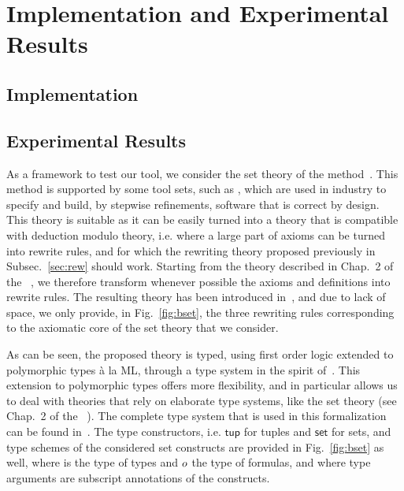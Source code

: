 
\section{Implementation and Experimental Results}
\label{sec:bench}

\subsection{Implementation}



\subsection{Experimental Results}

As a framework to test our tool, we consider the set theory of the \bmth{}
method~\cite{B-Book}. This method is supported by some tool sets, such as
\atelierb{}, which are used in industry to specify and build, by stepwise
refinements, software that is correct by design. This theory is suitable as it
can be easily turned into a theory that is compatible with deduction modulo
theory, i.e. where a large part of axioms can be turned into rewrite rules, and
for which the rewriting theory proposed previously in Subsec.~\ref{sec:rew}
should work. Starting from the theory described in Chap.~2 of the
\bbook{}~\cite{B-Book}, we therefore transform whenever possible the axioms and
definitions into rewrite rules. The resulting theory has been introduced
in~\cite{BA15}, and due to lack of space, we only provide, in
Fig.~\ref{fig:bset}, the three rewriting rules corresponding to the axiomatic
core of the \bmth{} set theory that we consider.

As can be seen, the proposed theory is typed, using first order logic extended
to polymorphic types à la ML, through a type system in the spirit
of~\cite{BP13}. This extension to polymorphic types offers more flexibility, and
in particular allows us to deal with theories that rely on elaborate type
systems, like the \bmth{} set theory (see Chap.~2 of the
\bbook{}~\cite{B-Book}). The complete type system that is used in this
formalization can be found in~\cite{BA15}. The type constructors,
i.e. $\mathsf{tup}$ for tuples and $\mathsf{set}$ for sets, and type schemes of
the considered set constructs are provided in Fig.~\ref{fig:bset} as well, where
\type{} is the type of types and $o$ the type of formulas, and where type
arguments are subscript annotations of the constructs.

